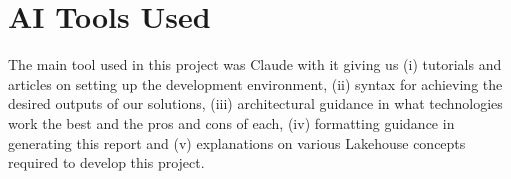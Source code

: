 \documentclass[conference]{IEEEtran}
\begin{document}
\appendix
\section*{AI Tools Used}
The main tool used in this project was Claude with it giving us (i) tutorials and articles on setting up the development environment, (ii) syntax for achieving the desired outputs of our solutions, (iii) architectural guidance in what technologies work the best and the pros and cons of each, (iv) formatting guidance in generating this report and (v) explanations on various Lakehouse concepts required to develop this project.
\end{document}
